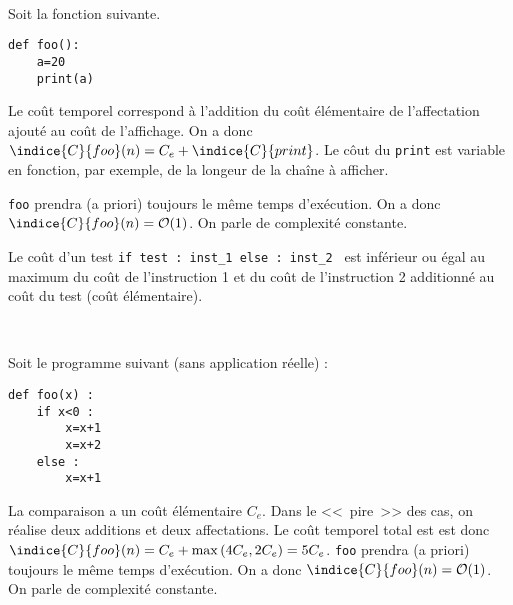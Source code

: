 \begin{exemple}~\\ \vspace{-.3cm}
\noindent\begin{minipage}[c]{.47\linewidth}
Soit la fonction suivante.
\begin{lstlisting}
def foo():
    a=20
    print(a)
\end{lstlisting}

\end{minipage}\hfill
\begin{minipage}[c]{.47\linewidth}
Le coût temporel correspond à l'addition du coût élémentaire de l'affectation ajouté au coût de l'affichage.
On a donc $\indice{C}{foo}(n) = C_e + \indice{C}{print}$. Le côut du \texttt{print} est variable en fonction, par exemple, de la longeur de la chaîne à afficher.

\texttt{foo} prendra (a priori) toujours le même temps d'exécution. On a donc $\indice{C}{foo}(n) = \mathcal{O}(1)$. On parle de complexité constante. 

\end{minipage}
\end{exemple}


\begin{resultat}
Le coût d'un test \texttt{if test : inst\_1 else : inst\_2 } est inférieur ou égal au maximum du coût de l'instruction 1 et du coût de l'instruction 2 additionné au coût du test (coût élémentaire). 
\end{resultat}

\begin{exemple}~\\ \vspace{-.3cm}
\noindent\begin{minipage}[c]{.47\linewidth}
Soit le programme suivant (sans application réelle) :
\begin{lstlisting}
def foo(x) :
    if x<0 :
        x=x+1
        x=x+2
    else :
        x=x+1
\end{lstlisting}

\end{minipage}\hfill
\begin{minipage}[c]{.47\linewidth}
La comparaison a un coût élémentaire $C_e$. Dans le <<~pire~>> des cas, on réalise deux additions et deux affectations. 
Le coût temporel total est est donc $\indice{C}{foo}(n) = C_e + \max\left(4C_e, 2C_e \right) = 5C_e$.
\texttt{foo} prendra (a priori) toujours le même temps d'exécution. On a donc $\indice{C}{foo}(n) = \mathcal{O}(1)$. On parle de complexité constante. 
\end{minipage}
\end{exemple}


